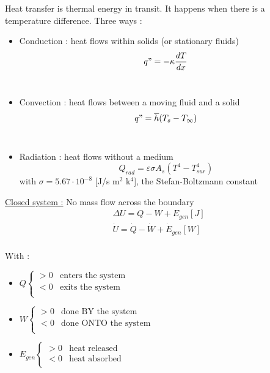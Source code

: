\documentclass[../main.tex]{subfiles}
\begin{document}
\localtableofcontents

Heat transfer is thermal energy in transit. It happens when there is a temperature difference. Three ways : \begin{itemize}
    \item Conduction : heat flows within solids (or stationary fluids) \begin{equation}
        q" = -\kappa \frac{dT}{dx}
    \end{equation}\\
    \item Convection : heat flows between a moving fluid and a solid \begin{equation}
        q" = \overline{h} (T_s-T_\infty)
    \end{equation}\\
    \item Radiation : heat flows without a medium \begin{equation}
        Q_{rad} = \varepsilon \sigma A_s (T^4-T_{sur}^4)
    \end{equation} with $\sigma = 5.67\cdot 10^{-8}$ [J/s m$^2$ k$^4$], the Stefan-Boltzmann constant\\
\end{itemize}

\quad \underline{Closed system :} No mass flow across the boundary\\

\begin{equation}\begin{gathered}
    \Delta U = Q-W + E_{gen} [J]\\
    \Dot{U} = \dot{Q}-\dot{W}+ \Dot{E}_{gen} [W]\\
    \end{gathered}
\end{equation}

With : \begin{itemize}
    \item $Q \begin{cases}
        > 0 & \text{enters the system}\\
        <0 & \text{exits the system}\\
    \end{cases}$\\
    \item $W \begin{cases}
        > 0 &\text{done BY the system}\\
        <0 &\text{done ONTO the system}\\
    \end{cases}$\\
    \item $E_{gen}\begin{cases}
        > 0 &\text{heat released}\\
        < 0 &\text{heat absorbed}\\
    \end{cases}$
\end{itemize}
\end{document}
